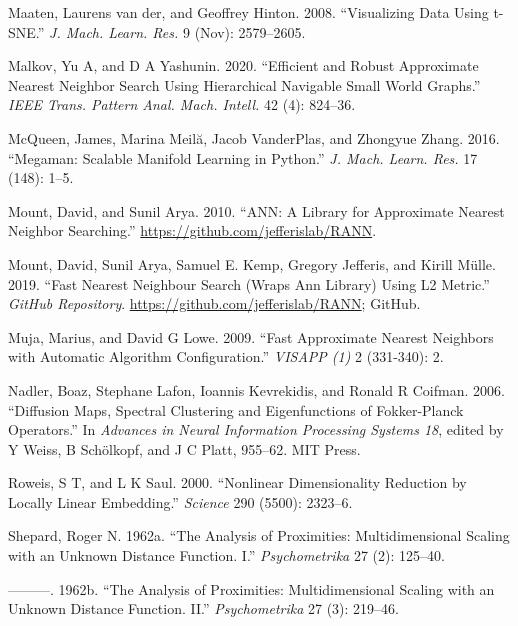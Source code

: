 \documentclass[12pt]{article}
\newlength{\cslhangindent}
\newenvironment{cslreferences}%
  {\setlength{\parindent}{0pt}%
  \everypar{\setlength{\hangindent}{\cslhangindent}}\ignorespaces}%
  {\par}
\begin{document}
\begin{cslreferences}
\leavevmode\hypertarget{ref-Maaten2008-dw}{}%
Maaten, Laurens van der, and Geoffrey Hinton. 2008. ``Visualizing Data Using t-SNE.'' \emph{J. Mach. Learn. Res.} 9 (Nov): 2579--2605.

\leavevmode\hypertarget{ref-Malkov2020-jp}{}%
Malkov, Yu A, and D A Yashunin. 2020. ``Efficient and Robust Approximate Nearest Neighbor Search Using Hierarchical Navigable Small World Graphs.'' \emph{IEEE Trans. Pattern Anal. Mach. Intell.} 42 (4): 824--36.

\leavevmode\hypertarget{ref-McQueen2016-xz}{}%
McQueen, James, Marina Meilă, Jacob VanderPlas, and Zhongyue Zhang. 2016. ``Megaman: Scalable Manifold Learning in Python.'' \emph{J. Mach. Learn. Res.} 17 (148): 1--5.

\leavevmode\hypertarget{ref-mount2010-ann}{}%
Mount, David, and Sunil Arya. 2010. ``ANN: A Library for Approximate Nearest Neighbor Searching.'' \url{https://github.com/jefferislab/RANN}.

\leavevmode\hypertarget{ref-jefferislab2019-l2}{}%
Mount, David, Sunil Arya, Samuel E. Kemp, Gregory Jefferis, and Kirill Mülle. 2019. ``Fast Nearest Neighbour Search (Wraps Ann Library) Using L2 Metric.'' \emph{GitHub Repository}. \url{https://github.com/jefferislab/RANN}; GitHub.

\leavevmode\hypertarget{ref-Muja2009-de}{}%
Muja, Marius, and David G Lowe. 2009. ``Fast Approximate Nearest Neighbors with Automatic Algorithm Configuration.'' \emph{VISAPP (1)} 2 (331-340): 2.

\leavevmode\hypertarget{ref-Nadler2006-cm}{}%
Nadler, Boaz, Stephane Lafon, Ioannis Kevrekidis, and Ronald R Coifman. 2006. ``Diffusion Maps, Spectral Clustering and Eigenfunctions of Fokker-Planck Operators.'' In \emph{Advances in Neural Information Processing Systems 18}, edited by Y Weiss, B Schölkopf, and J C Platt, 955--62. MIT Press.

\leavevmode\hypertarget{ref-Roweis2000-ni}{}%
Roweis, S T, and L K Saul. 2000. ``Nonlinear Dimensionality Reduction by Locally Linear Embedding.'' \emph{Science} 290 (5500): 2323--6.

\leavevmode\hypertarget{ref-Shepard1962a}{}%
Shepard, Roger N. 1962a. ``The Analysis of Proximities: Multidimensional Scaling with an Unknown Distance Function. I.'' \emph{Psychometrika} 27 (2): 125--40.

\leavevmode\hypertarget{ref-Shepard1962b}{}%
---------. 1962b. ``The Analysis of Proximities: Multidimensional Scaling with an Unknown Distance Function. II.'' \emph{Psychometrika} 27 (3): 219--46.


\end{cslreferences}
\end{document}
